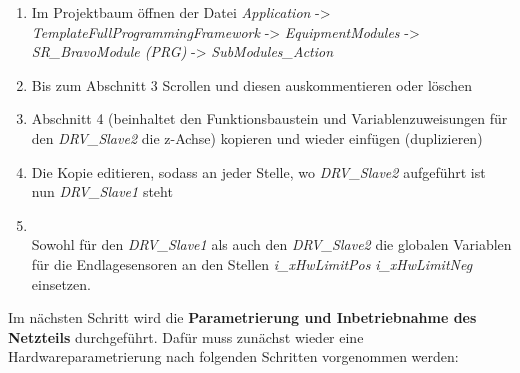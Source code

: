 \documentclass[../../../Bachelorarbeit.tex]{subfiles}
\begin{document}
\begin{enumerate}
    \item Im Projektbaum öffnen der Datei \textit{Application} -> \textit{TemplateFullProgrammingFramework} -> \textit{EquipmentModules} -> \textit{SR\_BravoModule (PRG)} -> \textit{SubModules\_Action}
    \item Bis zum Abschnitt 3 Scrollen und diesen auskommentieren oder löschen
    \item Abschnitt 4 (beinhaltet den Funktionsbaustein und Variablenzuweisungen für den \textit{DRV\_Slave2} \bzw die z-Achse) kopieren und wieder einfügen (duplizieren)
    \item Die Kopie editieren, sodass an jeder Stelle, wo \textit{DRV\_Slave2} aufgeführt ist nun \textit{DRV\_Slave1} steht
    \item \begin{minipage}[t]{\linewidth}
        \raggedright
        \label{fig:my-img37}
    \end{minipage}
    \bigskip \\
    Sowohl für den \textit{DRV\_Slave1} als auch den \textit{DRV\_Slave2} die globalen Variablen für die Endlagesensoren an den Stellen \textit{i\_xHwLimitPos} \bzw \textit{i\_xHwLimitNeg} einsetzen.
\end{enumerate}

Im nächsten Schritt wird die \textbf{Parametrierung und Inbetriebnahme des Netzteils} durchgeführt. Dafür muss zunächst wieder eine Hardwareparametrierung nach folgenden Schritten vorgenommen werden:
\end{document}
